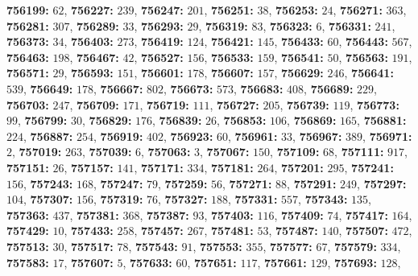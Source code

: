 \textsf{\bfseries 756199:} $62$, \textsf{\bfseries 756227:} $239$, \textsf{\bfseries 756247:} $201$, \textsf{\bfseries 756251:} $38$, \textsf{\bfseries 756253:} $24$, \textsf{\bfseries 756271:} $363$, \textsf{\bfseries 756281:} $307$, \textsf{\bfseries 756289:} $33$, \textsf{\bfseries 756293:} $29$, \textsf{\bfseries 756319:} $83$, \textsf{\bfseries 756323:} $6$, \textsf{\bfseries 756331:} $241$, \textsf{\bfseries 756373:} $34$, \textsf{\bfseries 756403:} $273$, \textsf{\bfseries 756419:} $124$, \textsf{\bfseries 756421:} $145$, \textsf{\bfseries 756433:} $60$, \textsf{\bfseries 756443:} $567$, \textsf{\bfseries 756463:} $198$, \textsf{\bfseries 756467:} $42$, \textsf{\bfseries 756527:} $156$, \textsf{\bfseries 756533:} $159$, \textsf{\bfseries 756541:} $50$, \textsf{\bfseries 756563:} $191$, \textsf{\bfseries 756571:} $29$, \textsf{\bfseries 756593:} $151$, \textsf{\bfseries 756601:} $178$, \textsf{\bfseries 756607:} $157$, \textsf{\bfseries 756629:} $246$, \textsf{\bfseries 756641:} $539$, \textsf{\bfseries 756649:} $178$, \textsf{\bfseries 756667:} $802$, \textsf{\bfseries 756673:} $573$, \textsf{\bfseries 756683:} $408$, \textsf{\bfseries 756689:} $229$, \textsf{\bfseries 756703:} $247$, \textsf{\bfseries 756709:} $171$, \textsf{\bfseries 756719:} $111$, \textsf{\bfseries 756727:} $205$, \textsf{\bfseries 756739:} $119$, \textsf{\bfseries 756773:} $99$, \textsf{\bfseries 756799:} $30$, \textsf{\bfseries 756829:} $176$, \textsf{\bfseries 756839:} $26$, \textsf{\bfseries 756853:} $106$, \textsf{\bfseries 756869:} $165$, \textsf{\bfseries 756881:} $224$, \textsf{\bfseries 756887:} $254$, \textsf{\bfseries 756919:} $402$, \textsf{\bfseries 756923:} $60$, \textsf{\bfseries 756961:} $33$, \textsf{\bfseries 756967:} $389$, \textsf{\bfseries 756971:} $2$, \textsf{\bfseries 757019:} $263$, \textsf{\bfseries 757039:} $6$, \textsf{\bfseries 757063:} $3$, \textsf{\bfseries 757067:} $150$, \textsf{\bfseries 757109:} $68$, \textsf{\bfseries 757111:} $917$, \textsf{\bfseries 757151:} $26$, \textsf{\bfseries 757157:} $141$, \textsf{\bfseries 757171:} $334$, \textsf{\bfseries 757181:} $264$, \textsf{\bfseries 757201:} $295$, \textsf{\bfseries 757241:} $156$, \textsf{\bfseries 757243:} $168$, \textsf{\bfseries 757247:} $79$, \textsf{\bfseries 757259:} $56$, \textsf{\bfseries 757271:} $88$, \textsf{\bfseries 757291:} $249$, \textsf{\bfseries 757297:} $104$, \textsf{\bfseries 757307:} $156$, \textsf{\bfseries 757319:} $76$, \textsf{\bfseries 757327:} $188$, \textsf{\bfseries 757331:} $557$, \textsf{\bfseries 757343:} $135$, \textsf{\bfseries 757363:} $437$, \textsf{\bfseries 757381:} $368$, \textsf{\bfseries 757387:} $93$, \textsf{\bfseries 757403:} $116$, \textsf{\bfseries 757409:} $74$, \textsf{\bfseries 757417:} $164$, \textsf{\bfseries 757429:} $10$, \textsf{\bfseries 757433:} $258$, \textsf{\bfseries 757457:} $267$, \textsf{\bfseries 757481:} $53$, \textsf{\bfseries 757487:} $140$, \textsf{\bfseries 757507:} $472$, \textsf{\bfseries 757513:} $30$, \textsf{\bfseries 757517:} $78$, \textsf{\bfseries 757543:} $91$, \textsf{\bfseries 757553:} $355$, \textsf{\bfseries 757577:} $67$, \textsf{\bfseries 757579:} $334$, \textsf{\bfseries 757583:} $17$, \textsf{\bfseries 757607:} $5$, \textsf{\bfseries 757633:} $60$, \textsf{\bfseries 757651:} $117$, \textsf{\bfseries 757661:} $129$, \textsf{\bfseries 757693:} $128$, 
